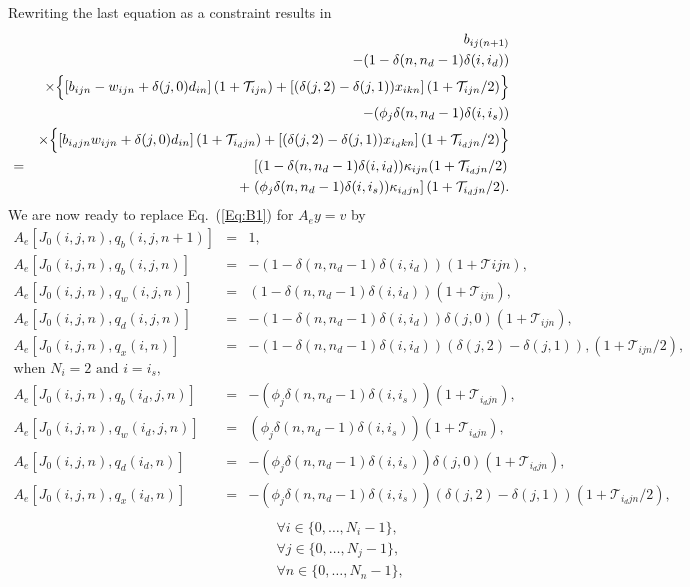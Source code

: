 \documentclass{report}[fleqn,12pt]
\begin{document}
Rewriting the last equation as a constraint results in
\begin{eqnarray}
	&&b_{ij(n+1)} 
	  \nonumber  \\
	&& - (1 - \delta(n, n_d-1)\delta(i, i_d)) \nonumber\\
	&& \times \Bigl\{ \left[b_{ijn} - w_{ijn} + \delta(j, 0)d_{in} \right](1 + \mathcal{T}_{ijn})
	+ \left[(\delta(j, 2) - \delta(j, 1))x_{ikn}\right](1 + \mathcal{T}_{ijn}/2) \Bigr\}
	\nonumber \\
	&&- (\phi_j\delta(n, n_d-1)\delta(i, i_s)) \nonumber \\
	&& \times \Bigl\{ \left[b_{i_djn} w_{ijn} + \delta(j, 0)d_{in}\right](1 + \mathcal{T}_{i_djn})
	+ \left[(\delta(j, 2) - \delta(j, 1))x_{i_dkn}\right](1 + \mathcal{T}_{i_djn}/2) \Bigr\}
	\nonumber \\
	&=& \left[(1 - \delta(n, n_d-1)\delta(i, i_d)) \kappa_{ijn} (1 + \mathcal{T}_{i_djn}/2) \right.
	\nonumber\\
	&& + \left.(\phi_j\delta(n, n_d-1)\delta(i, i_s))
	\kappa_{i_djn}\right](1 + \mathcal{T}_{i_djn}/2).
\end{eqnarray}
We are now ready to replace Eq.~(\ref{Eq:B1}) for $A_ey = v$ by
\begin{eqnarray}
        \label{Eq:B2}
        A_e[J_0(i, j, n), q_b(i, j, n+1)] &=& 1, \nonumber \\
        A_e[J_0(i, j, n), q_b(i, j, n)] &=& - (1 - \delta(n, n_d-1)\delta(i, i_d))
		(1 + \mathcal{T}{ijn}), \nonumber \\
        A_e[J_0(i, j, n), q_w(i, j, n)] &=& (1 - \delta(n, n_d-1)\delta(i, i_d))
	(1 + \mathcal{T}_{ijn}),\nonumber \\
        A_e[J_0(i, j, n), q_d(i, j, n)] &=& - (1 - \delta(n, n_d-1)\delta(i, i_d))
		\delta(j, 0) (1 + \mathcal{T}_{ijn}), \nonumber \\
        A_e[J_0(i, j, n), q_x(i, n)] &=& - (1 - \delta(n, n_d-1)\delta(i, i_d))
                (\delta(j, 2) - \delta(j, 1)),
		(1 + \mathcal{T}_{ijn}/2), \nonumber \\
		\text{when $N_i =2$ and $i = i_s$,} && \nonumber\\
        A_e[J_0(i, j, n), q_b(i_d, j, n)] &=& - (\phi_j\delta(n, n_d-1)\delta(i, i_s))
		(1 + \mathcal{T}_{i_djn}), \nonumber \\
        A_e[J_0(i, j, n), q_w(i_d, j, n)] &=& (\phi_j\delta(n, n_d-1)\delta(i, i_s))
	(1 + \mathcal{T}_{i_djn}), \nonumber\\
        A_e[J_0(i, j, n), q_d(i_d, n)] &=&  -(\phi_j\delta(n, n_d-1)\delta(i, i_s))
		\delta(j, 0)(1 + \mathcal{T}_{i_djn}), \nonumber \\
        A_e[J_0(i, j, n), q_x(i_d, n)] &=& - (\phi_j\delta(n, n_d-1)\delta(i, i_s))
                (\delta(j, 2) - \delta(j, 1))
		(1 + \mathcal{T}_{i_djn}/2), \nonumber \\
                \nonumber \\
        &&\qquad\forall i \in \{0,\ldots, N_i-1\},\nonumber\\
        &&\qquad\forall j \in \{0,\ldots, N_j-1\},\nonumber\\
        &&\qquad\forall n \in \{0,\ldots, N_n-1\}, \nonumber
\end{eqnarray}
\end{document}
